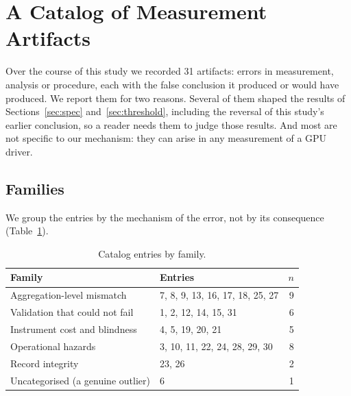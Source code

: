 
\section{A Catalog of Measurement Artifacts}
\label{sec:pitfalls}

Over the course of this study we recorded 31 artifacts: errors in measurement,
analysis or procedure, each with the false conclusion it produced or would have
produced. We report them for two reasons.
Several of them shaped the results of Sections~\ref{sec:spec}
and~\ref{sec:threshold}, including the reversal of this study's earlier
conclusion, so a reader needs them to judge those results. And most are not
specific to our mechanism: they can arise in any measurement of a GPU driver.

\subsection{Families}

We group the entries by the mechanism of the error, not by its consequence
(Table~\ref{tab:families}).

\begin{table}[t]
\centering
\footnotesize
\caption{Catalog entries by family.}
\label{tab:families}
\begin{tabular}{@{}l l r@{}}
\toprule
Family & Entries & $n$\\
\midrule
Aggregation-level mismatch & 7, 8, 9, 13, 16, 17, 18, 25, 27 & 9\\
Validation that could not fail & 1, 2, 12, 14, 15, 31 & 6\\
Instrument cost and blindness & 4, 5, 19, 20, 21 & 5\\
Operational hazards & 3, 10, 11, 22, 24, 28, 29, 30 & 8\\
Record integrity & 23, 26 & 2\\
Uncategorised (a genuine outlier) & 6 & 1\\
\bottomrule
\end{tabular}
\end{table}

